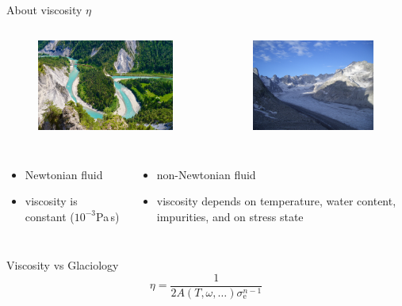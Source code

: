 \documentclass[hide notes,intlimits,unknownkeysallowed]{beamer}
\begin{document}
\begin{frame}{About viscosity $\eta$}
    \begin{columns}
      \column[C]{6cm}
      \begin{figure}
        \includegraphics[height=3cm]{rhine_river}
      \end{figure}
      \column[C]{6cm}
      \begin{figure}
        \includegraphics[height=3cm]{forno}
      \end{figure}
  \end{columns}
    \begin{columns}
      \column[C]{6cm}
      \begin{itemize}
        \item Newtonian fluid
        \item viscosity is constant ($10^{-3}$Pa\,s)
      \end{itemize}
      \column[C]{6cm}
      \begin{itemize}
      \item non-Newtonian fluid
        \item viscosity depends on temperature, water content, impurities, and on \alert{stress state}
      \end{itemize}
  \end{columns}
\end{frame}

\begin{frame}{Viscosity vs Glaciology}
  \begin{equation}
    \eta = \frac{1}{2 A(T,\omega,\ldots) \sigma_{\mathrm{e}}^{n-1}}
  \end{equation}
\end{frame}
\end{document}
